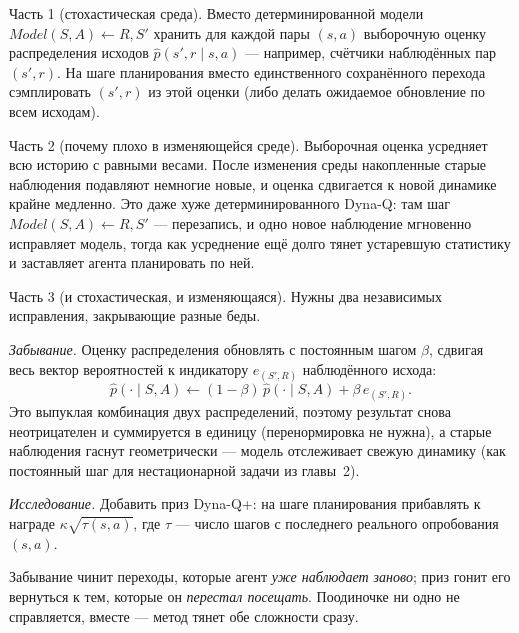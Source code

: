 \begin{solution}
    Часть 1 (стохастическая среда). Вместо детерминированной модели
    $Model(S,A)\leftarrow R,S'$ хранить для каждой пары $(s,a)$ выборочную оценку
    распределения исходов $\hat p(s',r\mid s,a)$ --- например, счётчики
    наблюдённых пар $(s',r)$. На шаге планирования вместо единственного
    сохранённого перехода сэмплировать $(s',r)$ из этой оценки (либо делать
    ожидаемое обновление по всем исходам).

    Часть 2 (почему плохо в изменяющейся среде). Выборочная оценка усредняет всю
    историю с равными весами. После изменения среды накопленные старые
    наблюдения подавляют немногие новые, и оценка сдвигается к новой динамике
    крайне медленно. Это даже хуже детерминированного Dyna-Q: там шаг
    $Model(S,A)\leftarrow R,S'$ --- перезапись, и одно новое наблюдение мгновенно
    исправляет модель, тогда как усреднение ещё долго тянет устаревшую статистику
    и заставляет агента планировать по ней.

    Часть 3 (и стохастическая, и изменяющаяся). Нужны два независимых
    исправления, закрывающие разные беды.

    \emph{Забывание.} Оценку распределения обновлять с постоянным шагом $\beta$,
    сдвигая весь вектор вероятностей к индикатору $e_{(S',R)}$ наблюдённого
    исхода:
    \begin{equation*}
        \hat p(\cdot\mid S,A)\leftarrow (1-\beta)\,\hat p(\cdot\mid S,A)
        + \beta\, e_{(S',R)}.
    \end{equation*}
    Это выпуклая комбинация двух распределений, поэтому результат снова
    неотрицателен и суммируется в единицу (перенормировка не нужна), а старые
    наблюдения гаснут геометрически --- модель отслеживает свежую динамику (как
    постоянный шаг для нестационарной задачи из главы~2).

    \emph{Исследование.} Добавить приз Dyna-Q+: на шаге планирования прибавлять к
    награде $\kappa\sqrt{\tau(s,a)}$, где $\tau$ --- число шагов с последнего
    реального опробования $(s,a)$.

    Забывание чинит переходы, которые агент \emph{уже наблюдает заново}; приз
    гонит его вернуться к тем, которые он \emph{перестал посещать}. Поодиночке ни
    одно не справляется, вместе --- метод тянет обе сложности сразу.


\end{solution}
